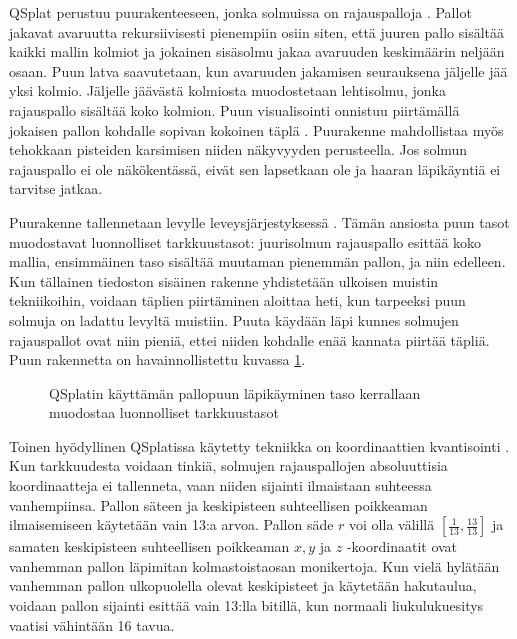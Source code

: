 QSplat perustuu puurakenteeseen, jonka solmuissa on rajauspalloja . Pallot jakavat avaruutta rekursiivisesti pienempiin osiin siten, että juuren pallo sisältää kaikki mallin kolmiot ja jokainen sisäsolmu jakaa avaruuden keskimäärin neljään osaan. Puun latva saavutetaan, kun avaruuden jakamisen seurauksena jäljelle jää yksi kolmio. Jäljelle jäävästä kolmiosta muodostetaan lehtisolmu, jonka rajauspallo sisältää koko kolmion. Puun visualisointi onnistuu piirtämällä jokaisen pallon kohdalle sopivan kokoinen täplä . Puurakenne mahdollistaa myös tehokkaan pisteiden karsimisen niiden näkyvyyden perusteella. Jos solmun rajauspallo ei ole näkökentässä, eivät sen lapsetkaan ole ja haaran läpikäyntiä ei tarvitse jatkaa. \cite{qsplat}

Puurakenne tallennetaan levylle leveysjärjestyksessä . Tämän ansiosta puun tasot muodostavat luonnolliset tarkkuustasot: juurisolmun rajauspallo esittää koko mallia, ensimmäinen taso sisältää muutaman pienemmän pallon, ja niin edelleen. Kun tällainen tiedoston sisäinen rakenne yhdistetään ulkoisen muistin tekniikoihin, voidaan täplien piirtäminen aloittaa heti, kun tarpeeksi puun solmuja on ladattu levyltä muistiin. Puuta käydään läpi kunnes solmujen rajauspallot ovat niin pieniä, ettei niiden kohdalle enää kannata piirtää täpliä. Puun rakennetta on havainnollistettu kuvassa \ref{tarkkuustasot}. \cite{qsplat}

\begin{figure}
    \centering
    
    \caption{QSplatin käyttämän pallopuun läpikäyminen taso kerrallaan muodostaa luonnolliset tarkkuustasot}
    \label{tarkkuustasot}
\end{figure}

Toinen hyödyllinen QSplatissa käytetty tekniikka on koordinaattien kvantisointi . Kun tarkkuudesta voidaan tinkiä, solmujen rajauspallojen absoluuttisia koordinaatteja ei tallenneta, vaan niiden sijainti ilmaistaan suhteessa vanhempiinsa. Pallon säteen ja keskipisteen suhteellisen poikkeaman ilmaisemiseen käytetään vain 13:a arvoa. Pallon säde $r$ voi olla välillä $[\frac{1}{13}, \frac{13}{13}]$ ja samaten keskipisteen suhteellisen poikkeaman $x, y$ ja $z$ -koordinaatit ovat vanhemman pallon läpimitan kolmastoistaosan monikertoja. Kun vielä hylätään vanhemman pallon ulkopuolella olevat keskipisteet ja käytetään hakutaulua, voidaan pallon sijainti esittää vain 13:lla bitillä, kun normaali liukulukuesitys vaatisi vähintään 16 tavua. \cite{qsplat}

